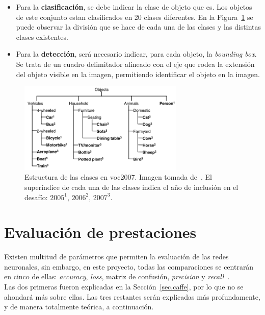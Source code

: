 \begin{itemize}
	\item Para la \textbf{clasificación}, se debe indicar la clase de objeto que es. Los objetos de este conjunto estan clasificados en 20 clases diferentes. En la Figura~\ref{fig.clasesVOC} se puede observar la división que se hace de cada una de las clases y las distintas clases existentes.
	\item Para la \textbf{detección}, será necesario indicar, para cada objeto, la \textit{bounding box}. Se trata de un cuadro delimitador alineado con el eje que rodea la extensión del objeto visible en la imagen, permitiendo identificar el objeto en la imagen.
\end{itemize}
\begin{figure}[H]
	\begin{center}
		\includegraphics[width=0.7\textwidth]{figures/vocclasses}
		\caption{Estructura de las clases en \acrfull{voc}2007. Imagen tomada de~\cite{Everingham10}.
		El superíndice de cada una de las clases indica el año de inclusión en el desafío: $2005^1$, $2006^2$, $2007^3$.}
		\label{fig.clasesVOC}
	\end{center}
\end{figure}

\section{Evaluación de prestaciones} \label{sec.prestaciones}
Existen multitud de parámetros que permiten la evaluación de las redes neuronales, sin embargo, en este proyecto, todas las comparaciones se centrarán en cinco de ellas: \textit{accuracy}, \textit{loss}, matriz de confusión, \textit{precision} y \textit{recall}~\cite{pullum2007guidance}.\\

Las dos primeras fueron explicadas en la Sección~\ref{sec.caffe}, por lo que no se ahondará más sobre ellas. Las tres restantes serán explicadas más profundamente, y de manera totalmente teórica, a continuación.

